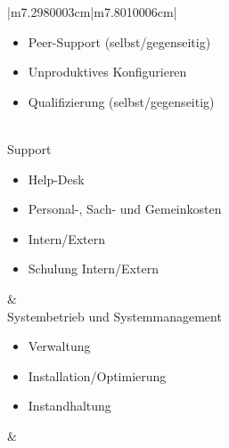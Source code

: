\documentclass[a4paper]{article}
\newcommand\liststyleLSxii{%
\renewcommand\labelitemi{${\bullet}$}
\renewcommand\labelitemii{${\circ}$}
\renewcommand\labelitemiii{${\blacksquare}$}
\renewcommand\labelitemiv{${\bullet}$}
}
\newcommand\liststyleLSxiii{%
\renewcommand\labelitemi{${\bullet}$}
\renewcommand\labelitemii{${\circ}$}
\renewcommand\labelitemiii{${\blacksquare}$}
\renewcommand\labelitemiv{${\bullet}$}
}
\newcommand\liststyleLSxiv{%
\renewcommand\labelitemi{${\bullet}$}
\renewcommand\labelitemii{${\circ}$}
\renewcommand\labelitemiii{${\blacksquare}$}
\renewcommand\labelitemiv{${\bullet}$}
}
\begin{document}
\begin{table}
\begin{tabular}{|m{7.2980003cm}|m{7.8010006cm}|}
\liststyleLSxii
\begin{itemize}
\item {\sffamily\color{black} Peer-Support (selbst/gegenseitig)}
\item {\sffamily\color{black} Unproduktives Konfigurieren}
\item {\sffamily\color{black} Qualifizierung (selbst/gegenseitig)}
\end{itemize}
\\\hline
{\sffamily\color{black} Support}

\liststyleLSxiii
\begin{itemize}
\item {\sffamily\color{black} Help-Desk}
\item {\sffamily\color{black} Personal-, Sach- und \newline
Gemeinkosten}
\item {\sffamily\color{black} Intern/Extern}
\item {\sffamily\color{black} Schulung Intern/Extern}
\end{itemize}
 &
~
\\\hline
{\sffamily\color{black} Systembetrieb und Systemmanagement}

\liststyleLSxiv
\begin{itemize}
\item {\sffamily\color{black} Verwaltung}
\item {\sffamily\color{black} Installation/Optimierung}
\item {\sffamily\color{black} Instandhaltung}
\end{itemize}
 &
~
\\\hline\end{tabular}
\caption[Auswahl IT{}-Kostenarten nach Krcmar ( Krcmar 2015)]{Auswahl IT-Kostenarten nach
Krcmar\textcolor[rgb]{1.0,0.2,0.2}{ ( }\textcolor{red}{Krcmar 2015)}}
\label{seq:refTable1}
\end{table}

\bigskip


\bigskip



\bigskip
\end{document}
